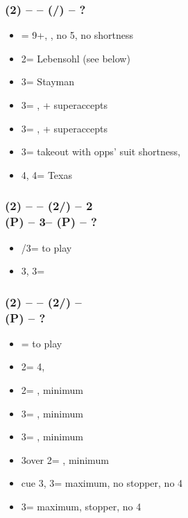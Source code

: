 \documentclass[12pt, a4paper]{article}
\begin{document}
\subsubsection*{(2\diams) -- \dbl -- (\hearts/\spades) -- ?}        
\begin{itemize}
    \item \dbl = 9+, \fton{2\nt}, no 5\major, no \major shortness
    \item 2\nt = Lebensohl (see below)
    \item 3\clubs = Stayman \vimp
    \item 3\diams = \trsf{\hearts}, \gf + superaccepts
    \item 3\hearts = \trsf{\spades}, \gf + superaccepts
    \item 3\spades = takeout with opps' suit shortness, \gf
    \item 4\diams, 4\hearts = Texas
\end{itemize}

\subsubsection*{(2\diams) -- \dbl -- (2\hearts/\spades) -- 2\nt \\
                (P) -- 3\clubs -- (P) -- ?}        
\begin{itemize}
    \item \pass/3\diams = to play
    \item 3\hearts, 3\spades = \inv
\end{itemize}

\subsubsection*{(2\diams) -- \dbl -- (2\hearts/\spades) -- \dbl \\
                (P) -- ?}        
\begin{itemize}
    \item \pass = to play
    \item 2\spades = 4\spades, \fonce
    \item 2\nt = \nat, minimum
    \item 3\clubs = \nat, minimum
    \item 3\diams = \nat, minimum
    \item 3\hearts over 2\spades = \nat, minimum
    \item cue 3\hearts, 3\spades = maximum, no stopper, no 4\spades
    \item 3\nt = maximum, stopper, no 4\spades
\end{itemize}
\end{document}
